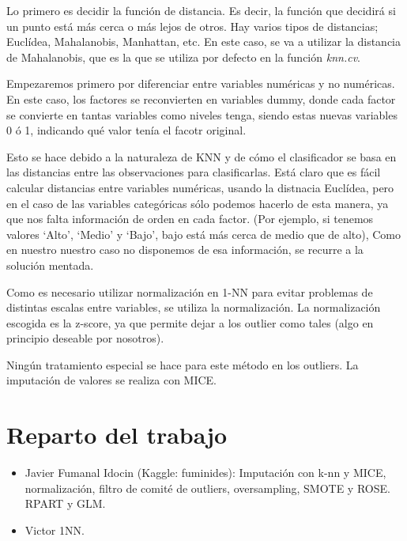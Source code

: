 \documentclass[]{scrartcl}
\begin{document}
Lo primero es decidir la función de distancia. Es decir, la función que decidirá si un punto está más cerca o más lejos de otros. Hay varios tipos de distancias; Euclídea, Mahalanobis, Manhattan, etc. En este caso, se va a utilizar la distancia de Mahalanobis, que es la que se utiliza por defecto en la función \emph{knn.cv}.

Empezaremos primero por diferenciar entre variables numéricas y no numéricas. En este caso, los factores se reconvierten en variables dummy, donde cada factor se convierte en tantas variables como niveles tenga, siendo estas nuevas variables 0 ó 1, indicando qué valor tenía el facotr original. 

Esto se hace debido a la naturaleza de KNN y de cómo el clasificador se basa en las distancias entre las observaciones para clasificarlas. Está claro que es fácil calcular distancias entre variables numéricas, usando la distnacia Euclídea, pero en el caso de las variables categóricas sólo podemos hacerlo de esta manera, ya que nos falta información de orden en cada factor. (Por ejemplo, si tenemos valores ‘Alto’, ‘Medio’ y ‘Bajo’, bajo está más cerca de medio que de alto), Como en nuestro nuestro caso no disponemos de esa información, se recurre a la solución mentada.

Como es necesario utilizar normalización en 1-NN para evitar problemas de distintas escalas entre variables, se utiliza la normalización. La normalización escogida es la z-score, ya que permite dejar a los outlier como tales (algo en principio deseable por nosotros).

Ningún tratamiento especial se hace para este método en los outliers. La imputación de valores se realiza con MICE.


\section{Reparto del trabajo}
\begin{itemize}
	\item Javier Fumanal Idocin (Kaggle: fuminides): Imputación con k-nn y MICE, normalización, filtro de comité de outliers, oversampling, SMOTE y ROSE. RPART y GLM.
	\item Victor 1NN.
	
\end{itemize}
\end{document}

